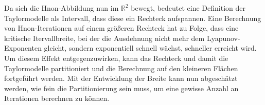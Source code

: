 Da sich die H\e non-Abbildung nun im $\mathbb{R}^2$ bewegt, bedeutet eine Definition der Taylormodelle als Intervall, dass diese ein Rechteck aufspannen. Eine Berechnung von H\e non-Iterationen auf einem größeren Rechteck hat zu Folge, dass eine kritische Itervallbreite, bei der die Ausdehnung nicht mehr dem Lyapunov-Exponenten gleicht, sondern exponentiell schnell wächst, schneller erreicht wird. Um diesem Effekt entgegenzuwirken, kann das Rechteck und damit die Taylormodelle partitioniert und die Berechnung auf den kleineren Flächen fortgeführt werden. Mit der Entwicklung der Breite kann nun abgeschätzt werden, wie fein die Partitionierung sein muss, um eine gewisse Anzahl an Iterationen berechnen zu können.
















 
